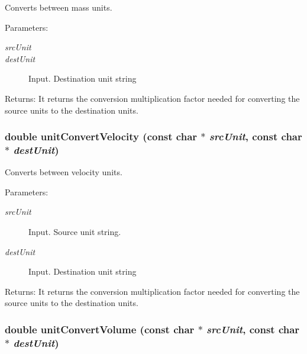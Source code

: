Converts between mass units. 

\begin{Desc}
\item[Parameters:]
\begin{description}
\item[{\em srcUnit}]\item[{\em destUnit}]Input. Destination unit string\end{description}
\end{Desc}
\begin{Desc}
\item[Returns:]It returns the conversion multiplication factor needed for converting the source units to the destination units. \end{Desc}
\hypertarget{group__unit__conv_g444606c1ce32b9818c42657b817895e0}{
\subsubsection[unitConvertVelocity]{\setlength{\rightskip}{0pt plus 5cm}double unitConvertVelocity (const char $\ast$ {\em srcUnit}, \/  const char $\ast$ {\em destUnit})}}
\label{group__unit__conv_g444606c1ce32b9818c42657b817895e0}


Converts between velocity units. 

\begin{Desc}
\item[Parameters:]
\begin{description}
\item[{\em srcUnit}]Input. Source unit string. \item[{\em destUnit}]Input. Destination unit string\end{description}
\end{Desc}
\begin{Desc}
\item[Returns:]It returns the conversion multiplication factor needed for converting the source units to the destination units. \end{Desc}
\hypertarget{group__unit__conv_g83e38e7be9d19563a1c4abae17158e3e}{
\subsubsection[unitConvertVolume]{\setlength{\rightskip}{0pt plus 5cm}double unitConvertVolume (const char $\ast$ {\em srcUnit}, \/  const char $\ast$ {\em destUnit})}}
\label{group__unit__conv_g83e38e7be9d19563a1c4abae17158e3e}


